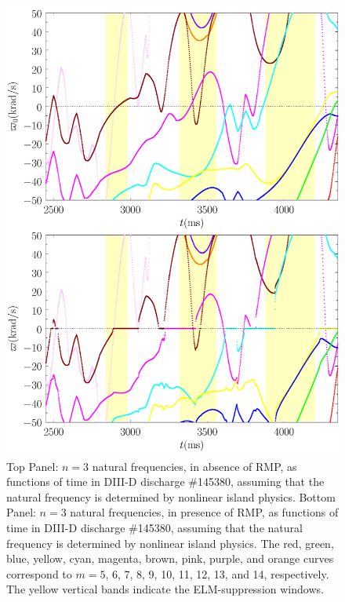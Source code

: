 \documentclass[12pt,prb,aps]{revtex4-1}
\begin{document}
\begin{figure}
\includegraphics[height=6in]{fig5.pdf}
\caption{Top Panel: $n=3$ natural frequencies, in absence of RMP, as functions of time
in   DIII-D discharge \#145380, assuming that the natural frequency is determined by nonlinear island physics.
Bottom Panel:  $n=3$ natural frequencies, in presence of RMP, as functions of time
in   DIII-D discharge \#145380, assuming that the natural frequency is determined by nonlinear island physics. The red, green, blue, yellow, cyan, magenta, brown, pink,
purple, and orange  curves correspond to $m=5$, 6, 7, 8, 9, 10, 11, 12, 13, and 14, respectively. The yellow vertical bands indicate the ELM-suppression windows.} \label{fig5}
\end{figure}
\end{document}
